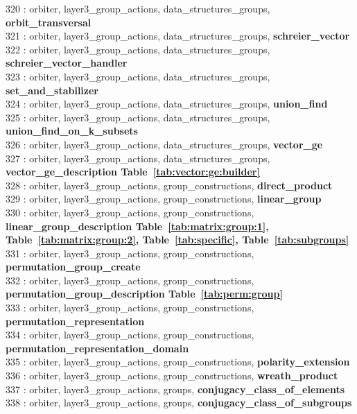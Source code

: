 320 : orbiter, layer3\_group\_actions, data\_structures\_groups, {\bf orbit\_transversal}\\
321 : orbiter, layer3\_group\_actions, data\_structures\_groups, {\bf schreier\_vector}\\
322 : orbiter, layer3\_group\_actions, data\_structures\_groups, {\bf schreier\_vector\_handler}\\
323 : orbiter, layer3\_group\_actions, data\_structures\_groups, {\bf set\_and\_stabilizer}\\
324 : orbiter, layer3\_group\_actions, data\_structures\_groups, {\bf union\_find}\\
325 : orbiter, layer3\_group\_actions, data\_structures\_groups, {\bf union\_find\_on\_k\_subsets}\\
326 : orbiter, layer3\_group\_actions, data\_structures\_groups, {\bf vector\_ge}\\
327 : orbiter, layer3\_group\_actions, data\_structures\_groups, {\bf vector\_ge\_description Table~\ref{tab:vector:ge:builder}}\\
328 : orbiter, layer3\_group\_actions, group\_constructions, {\bf direct\_product}\\
329 : orbiter, layer3\_group\_actions, group\_constructions, {\bf linear\_group}\\
330 : orbiter, layer3\_group\_actions, group\_constructions, {\bf linear\_group\_description Table~\ref{tab:matrix:group:1},  Table~\ref{tab:matrix:group:2},  Table~\ref{tab:specific},  Table~\ref{tab:subgroups}}\\
331 : orbiter, layer3\_group\_actions, group\_constructions, {\bf permutation\_group\_create}\\
332 : orbiter, layer3\_group\_actions, group\_constructions, {\bf permutation\_group\_description Table~\ref{tab:perm:group}}\\
333 : orbiter, layer3\_group\_actions, group\_constructions, {\bf permutation\_representation}\\
334 : orbiter, layer3\_group\_actions, group\_constructions, {\bf permutation\_representation\_domain}\\
335 : orbiter, layer3\_group\_actions, group\_constructions, {\bf polarity\_extension}\\
336 : orbiter, layer3\_group\_actions, group\_constructions, {\bf wreath\_product}\\
337 : orbiter, layer3\_group\_actions, groups, {\bf conjugacy\_class\_of\_elements}\\
338 : orbiter, layer3\_group\_actions, groups, {\bf conjugacy\_class\_of\_subgroups}\\
